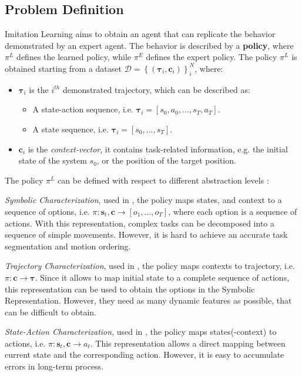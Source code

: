 \subsection{Problem Definition}
\label{sec:problem_formulation}
Imitation Learning aims to obtain an agent that can replicate the behavior demonstrated by an expert agent. The behavior is described by a \textbf{policy}, where $\pi^{L}$ defines the learned policy, while $\pi^{E}$ defines the expert policy.
\newline The policy $\pi^{L}$ is obtained starting from a dataset $\mathcal{D}=\left \{ \left ( \boldsymbol{\tau}_{i}, \boldsymbol{c}_{i}\right ) \right \}_{i}^{N}$, where:
\begin{itemize}
    \item $\boldsymbol{\tau}_{i}$ is the $i^{th}$ demonstrated trajectory, which can be described as:
        \begin{itemize}
            \item A state-action sequence, i.e. $\boldsymbol{\tau}_{i} = [s_{0}, a_{0}, \dots, s_{T}, a_{T}]$.
            \item A state sequence, i.e. $\boldsymbol{\tau}_{i} = [s_{0}, \dots, s_{T}]$.
        \end{itemize}    
    \item $\boldsymbol{c}_{i}$ is the \textit{context-vector}, it contains task-related information, e.g. the initial state of the system $s_{0}$, or the position of the target position.
\end{itemize}
The policy $\pi^{L}$ can be defined with respect to different abstraction levels \cite{fang2019survey,osa2018algorithmic}:   
\begin{enumerate*}[label=(\textbf{\alph*})]
    \item \textit{Symbolic Characterization}, used in \cite{}, the policy maps states, and context to a sequence of options, i.e. $\pi: \textbf{s}_{t}, \textbf{c} \rightarrow [o_1, \dots, o_T]$, where each option is a sequence of actions. With this representation, complex tasks can be decomposed into a sequence of simple movements. However, it is hard to achieve an accurate task segmentation and motion ordering.
    \item \textit{Trajectory Characterization}, used in \cite{}, the policy maps contexts to trajectory, i.e. $\pi: \mathbf{c} \rightarrow \boldsymbol{\tau}$. Since it allows to map initial state to a complete sequence of actions, this representation can be used to obtain the options in the Symbolic Representation. However, they need as many dynamic features as possible, that can be difficult to obtain.
    \item \textit{State-Action Characterization}, used in \cite{}, the policy maps states(-context) to actions, i.e. $\pi: \textbf{s}_{t}, \textbf{c} \rightarrow a_{t}$. This representation allows a direct mapping between current state and the corresponding action. However, it is easy to accumulate errors in long-term process.
\end{enumerate*} 
